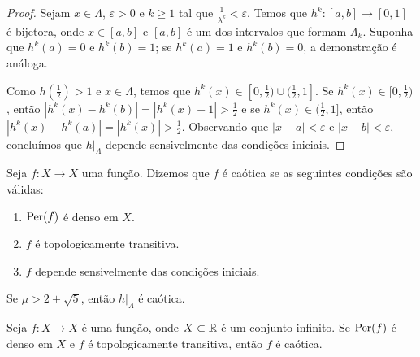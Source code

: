 \begin{proof}
Sejam $x \in \Lambda$, $\varepsilon > 0$ e $k \geq 1$ tal que $\frac{1}{\lambda^k} < \varepsilon$.
Temos que $h^k: [a, b] \to [0, 1]$ é bijetora, onde $x \in [a, b]$ e $[a, b]$ é um dos intervalos que formam $\Lambda_k$. Suponha que $h^k(a) = 0$ e $h^k(b) = 1$; se $h^k(a) = 1$ e $h^k(b) = 0$, a demonstração é análoga.

Como $h(\frac{1}{2}) > 1$ e $x \in \Lambda$, temos que $h^{k}(x) \in [0, \frac{1}{2}) \cup (\frac{1}{2}, 1]$. Se $h^{k}(x) \in [0, \frac{1}{2})$, então $|h^k(x) - h^k(b)| = |h^k(x) - 1| > \frac{1}{2}$ e se $h^{k}(x) \in (\frac{1}{2}, 1]$, então $|h^k(x) - h^k(a)| = |h^k(x)| > \frac{1}{2}$. Observando que $|x - a| < \varepsilon$ e  $|x - b| < \varepsilon$, concluímos que $h|_\Lambda$ depende sensivelmente das condições iniciais.
\end{proof}

\begin{definition}
Seja $f: X \to X$ uma função. Dizemos que $f$ é caótica se as seguintes condições são válidas:
\begin{enumerate}[label=\roman*.]
\item $\operatorname{Per}(f)$ é denso em $X$.
\item $f$ é topologicamente transitiva.
\item $f$ depende sensivelmente das condições iniciais.
\end{enumerate}
\end{definition}

\begin{theorem}
Se $\mu > 2 + \sqrt{5}$, então $h|_\Lambda$ é caótica.
\end{theorem}

\begin{theorem}
Seja $f: X \to X$ é uma função, onde $X \subset \mathbb{R}$ é um conjunto infinito. Se $\operatorname{Per}(f)$ é denso em $X$ e $f$ é topologicamente transitiva, então $f$ é caótica.
\end{theorem}
